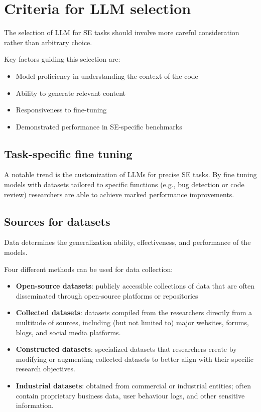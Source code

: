 \section{Criteria for LLM selection}
The selection of LLM for SE tasks should involve more careful consideration
rather than arbitrary choice.

Key factors guiding this selection are:

\begin{itemize}
  \item  Model proficiency in understanding the context of the code
  \item Ability to generate relevant content
  \item  Responsiveness to fine-tuning
  \item  Demonstrated performance in SE-specific benchmarks
\end{itemize}


\subsection{Task-specific fine tuning}
A notable trend is the customization of LLMs for precise SE tasks.
By fine tuning models with datasets tailored to specific functions (e.g., bug
detection or code review) researchers are able to achieve marked
performance improvements.


\subsection{Sources for datasets}

Data determines the generalization ability, effectiveness, and performance of the
models.

Four different methods can be used for data collection:

\begin{itemize}
  \item \textbf{Open-source datasets}: publicly accessible collections of data that are often disseminated
        through open-source platforms or repositories
  \item \textbf{Collected datasets}: datasets compiled from the researchers directly from a multitude of
        sources, including (but not limited to) major websites, forums, blogs, and social media
        platforms.
  \item \textbf{Constructed datasets}: specialized datasets that researchers create by modifying or
        augmenting collected datasets to better align with their specific research objectives.
  \item \textbf{Industrial datasets}: obtained from commercial or industrial entities; often contain
        proprietary business data, user behaviour logs, and other sensitive information.
\end{itemize}


